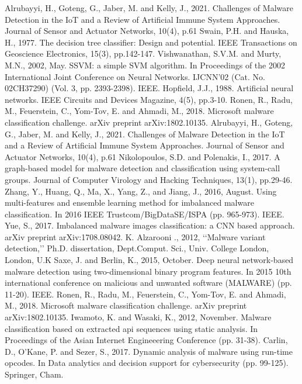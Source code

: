 \documentclass[conference]{IEEEtran}
\begin{document}
{{\begin{thebibliography}{00}
 Alrubayyi, H., Goteng, G., Jaber, M. and Kelly, J., 2021. Challenges of Malware Detection in the IoT
and a Review of Artificial Immune System Approaches. Journal of Sensor and Actuator Networks, 10(4),
p.61
 Swain, P.H. and Hauska, H., 1977. The decision tree classifier: Design and potential. IEEE Transactions on Geoscience Electronics, 15(3), pp.142-147.
 Vishwanathan, S.V.M. and Murty, M.N., 2002, May. SSVM: a simple SVM algorithm. In Proceedings of the 2002 International Joint Conference on Neural Networks. IJCNN'02 (Cat. No. 02CH37290) (Vol. 3, pp. 2393-2398). IEEE.
 Hopfield, J.J., 1988. Artificial neural networks. IEEE Circuits and Devices Magazine, 4(5), pp.3-10.
 Ronen, R., Radu, M., Feuerstein, C., Yom-Tov, E. and Ahmadi, M., 2018. Microsoft malware classification challenge. arXiv preprint arXiv:1802.10135.
 Alrubayyi, H., Goteng, G., Jaber, M. and Kelly, J., 2021. Challenges of Malware Detection in the IoT and a Review of Artificial Immune System Approaches. Journal of Sensor and Actuator Networks, 10(4), p.61
 Nikolopoulos, S.D. and Polenakis, I., 2017. A graph-based model for malware detection and classification using system-call groups. Journal of Computer Virology and Hacking Techniques, 13(1), pp.29-46.
 Zhang, Y., Huang, Q., Ma, X., Yang, Z., and Jiang, J., 2016, August. Using multi-features and ensemble learning method for imbalanced malware classification. In 2016 IEEE Trustcom/BigDataSE/ISPA (pp. 965-973). IEEE.
 Yue, S., 2017. Imbalanced malware images classification: a CNN based approach. arXiv preprint arXiv:1708.08042.
 K. Alzarooni ., 2012, ‘‘Malware variant detection,’’ Ph.D. dissertation, Dept.Comput. Sci., Univ. College London, London, U.K
 Saxe, J. and Berlin, K., 2015, October. Deep neural network-based malware detection using two-dimensional binary program features. In 2015 10th international conference on malicious and
unwanted software (MALWARE) (pp. 11-20). IEEE.
 Ronen, R., Radu, M., Feuerstein, C., Yom-Tov, E. and Ahmadi, M., 2018. Microsoft malware classification challenge. arXiv preprint arXiv:1802.10135.
 Iwamoto, K. and Wasaki, K., 2012, November. Malware classification based on extracted api sequences using static analysis. In Proceedings of the Asian Internet Engineeering Conference (pp. 31-38).
 Carlin, D., O’Kane, P. and Sezer, S., 2017. Dynamic analysis of malware using run-time opcodes. In Data analytics and decision support for cybersecurity (pp. 99-125). Springer, Cham.

\end{thebibliography}}}
\end{document}
